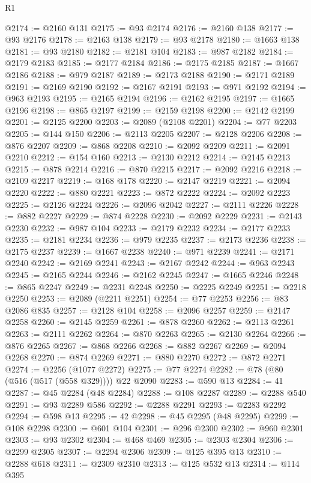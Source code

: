 \begin{lexlean}{R1}
\begin{coremodule}
@2174 := @2160 @131
@2175 := @93 @2174
@2176 := @2160 @138
@2177 := @93 @2176
@2178 := @2163 @138
@2179 := @93 @2178
@2180 := @1663 @138
@2181 := @93 @2180
@2182 := @2181 @104
@2183 := @987 @2182
@2184 := @2179 @2183
@2185 := @2177 @2184
@2186 := @2175 @2185
@2187 := @1667 @2186
@2188 := @979 @2187
@2189 := @2173 @2188
@2190 := @2171 @2189
@2191 := @2169 @2190
@2192 := @2167 @2191
@2193 := @971 @2192
@2194 := @963 @2193
@2195 := @2165 @2194
@2196 := @2162 @2195
@2197 := @1665 @2196
@2198 := @865 @2197
@2199 := @2159 @2198
@2200 := @2142 @2199
@2201 := @2125 @2200
@2203 := @2089 (@2108 @2201)
@2204 := @77 @2203
@2205 := @144 @150
@2206 := @2113 @2205
@2207 := @2128 @2206
@2208 := @876 @2207
@2209 := @868 @2208
@2210 := @2092 @2209
@2211 := @2091 @2210
@2212 := @154 @160
@2213 := @2130 @2212
@2214 := @2145 @2213
@2215 := @878 @2214
@2216 := @870 @2215
@2217 := @2092 @2216
@2218 := @2109 @2217
@2219 := @168 @178
@2220 := @2147 @2219
@2221 := @2094 @2220
@2222 := @880 @2221
@2223 := @872 @2222
@2224 := @2092 @2223
@2225 := @2126 @2224
@2226 := @2096 @2042
@2227 := @2111 @2226
@2228 := @882 @2227
@2229 := @874 @2228
@2230 := @2092 @2229
@2231 := @2143 @2230
@2232 := @987 @104
@2233 := @2179 @2232
@2234 := @2177 @2233
@2235 := @2181 @2234
@2236 := @979 @2235
@2237 := @2173 @2236
@2238 := @2175 @2237
@2239 := @1667 @2238
@2240 := @971 @2239
@2241 := @2171 @2240
@2242 := @2169 @2241
@2243 := @2167 @2242
@2244 := @963 @2243
@2245 := @2165 @2244
@2246 := @2162 @2245
@2247 := @1665 @2246
@2248 := @865 @2247
@2249 := @2231 @2248
@2250 := @2225 @2249
@2251 := @2218 @2250
@2253 := @2089 (@2211 @2251)
@2254 := @77 @2253
@2256 := @83 @2086 @835
@2257 := @2128 @104
@2258 := @2096 @2257
@2259 := @2147 @2258
@2260 := @2145 @2259
@2261 := @878 @2260
@2262 := @2113 @2261
@2263 := @2111 @2262
@2264 := @870 @2263
@2265 := @2130 @2264
@2266 := @876 @2265
@2267 := @868 @2266
@2268 := @882 @2267
@2269 := @2094 @2268
@2270 := @874 @2269
@2271 := @880 @2270
@2272 := @872 @2271
@2274 := @2256 (@1077 @2272)
@2275 := @77 @2274
@2282 := @78 (@80 (@516 (@517 (@558 @329)))) @22 @2090
@2283 := @590 @13
@2284 := 41
@2287 := @45 @2284 (@48 @2284)
@2288 := @108 @2287
@2289 := @2288 @540
@2291 := @93 @2289 @586
@2292 := @2288 @2291
@2293 := @2283 @2292
@2294 := @598 @13
@2295 := 42
@2298 := @45 @2295 (@48 @2295)
@2299 := @108 @2298
@2300 := @601 @104
@2301 := @296 @2300
@2302 := @960 @2301
@2303 := @93 @2302
@2304 := @468 @469
@2305 := @2303 @2304
@2306 := @2299 @2305
@2307 := @2294 @2306
@2309 := @125 @395 @13
@2310 := @2288 @618
@2311 := @2309 @2310
@2313 := @125 @532 @13
@2314 := @114 @395

\end{coremodule}
\end{lexlean}

